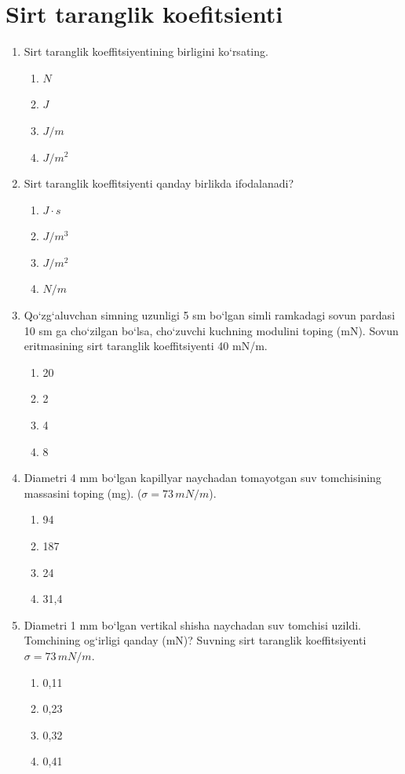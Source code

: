 \section{Sirt taranglik koefitsienti}


\begin{enumerate}

\item Sirt taranglik koeffitsiyentining birligini ko‘rsating.
\begin{enumerate}[label=\Alph*)]
\item $N$
\item $J$
\item $J/m$
\item $J/m^2$
\end{enumerate}

\item Sirt taranglik koeffitsiyenti qanday birlikda ifodalanadi?
\begin{enumerate}[label=\Alph*)]
\item $J \cdot s$
\item $J/m^3$
\item $J/m^2$
\item $N/m$
\end{enumerate}

\item Qo‘zg‘aluvchan simning uzunligi 5 sm bo‘lgan simli ramkadagi sovun pardasi 10 sm ga cho‘zilgan bo‘lsa, cho‘zuvchi kuchning modulini toping (mN). Sovun eritmasining sirt taranglik koeffitsiyenti 40 mN/m.
\begin{enumerate}[label=\Alph*)]
\item 20
\item 2
\item 4
\item 8
\end{enumerate}

\item Diametri 4 mm bo‘lgan kapillyar naychadan tomayotgan suv tomchisining massasini toping (mg). ($\sigma = 73 \, mN/m$).
\begin{enumerate}[label=\Alph*)]
\item 94
\item 187
\item 24
\item 31,4
\end{enumerate}

\item Diametri 1 mm bo‘lgan vertikal shisha naychadan suv tomchisi uzildi. Tomchining og‘irligi qanday (mN)? Suvning sirt taranglik koeffitsiyenti $\sigma = 73 \, mN/m$.
\begin{enumerate}[label=\Alph*)]
\item 0,11
\item 0,23
\item 0,32
\item 0,41
\end{enumerate}


\end{enumerate}
